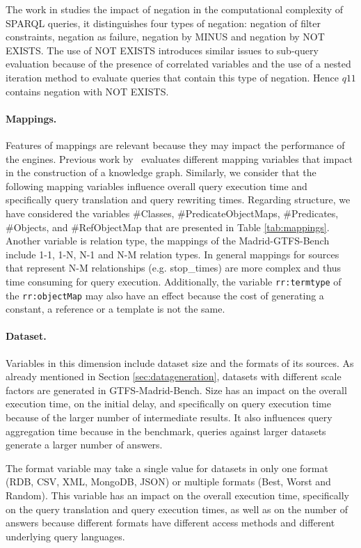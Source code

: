 The work in \citep{angles2016negation} studies the impact of negation in the computational complexity of SPARQL queries, it distinguishes four types of negation: negation of filter constraints, negation as failure, negation by MINUS and negation by NOT EXISTS.  The use of NOT EXISTS introduces similar issues to sub-query evaluation because of the  presence of correlated variables and the use of a nested iteration method to evaluate queries that contain this type of negation. Hence $q11$ contains negation with NOT EXISTS.


\noindent\paragraph{\textbf{Mappings.}}
Features of mappings are relevant because they may impact  the performance of the engines. Previous work by~\citep{chaves2019what} evaluates different mapping variables that impact in the construction of a knowledge graph. Similarly, we consider that the following mapping variables influence overall query execution time and specifically query translation and query rewriting times. Regarding structure, we have considered the variables \#Classes, \#PredicateObjectMaps, \#Predicates, \#Objects, and \#RefObjectMap that are presented in Table \ref{tab:mappings}. Another variable is relation type, the mappings of the Madrid-GTFS-Bench include 1-1, 1-N, N-1 and N-M relation types. In general mappings for sources that represent N-M relationships (e.g. stop\_times) are more complex and thus time consuming for query execution. Additionally, the variable \texttt{rr:termtype} of the \texttt{rr:objectMap} may also have an effect because the cost of generating a constant, a reference or a template is not the same.

\noindent\paragraph{\textbf{Dataset.}}
Variables in this dimension include dataset size and the formats of its sources. As already mentioned in Section \ref{sec:datageneration}, datasets with different scale factors are generated in GTFS-Madrid-Bench. Size has an impact on the overall execution time, on the initial delay, and specifically on query execution time because of the larger number of intermediate results. It also influences query aggregation time because in the benchmark, queries against larger datasets generate a larger number of answers.

The format variable may take a single value for datasets in only one format (RDB, CSV, XML, MongoDB, JSON) or multiple formats (Best, Worst and Random). This variable has an impact on the overall execution time, specifically on the query translation and query execution times, as well as on the number of answers because  different formats have different access methods and different underlying query languages.

